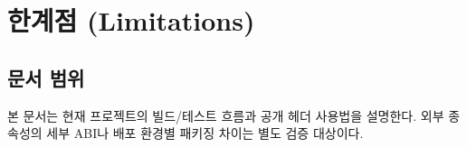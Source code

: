 \section{한계점 (Limitations)}

\subsection{문서 범위}
본 문서는 현재 프로젝트의 빌드/테스트 흐름과 공개 헤더 사용법을 설명한다.
외부 종속성의 세부 ABI나 배포 환경별 패키징 차이는 별도 검증 대상이다.
